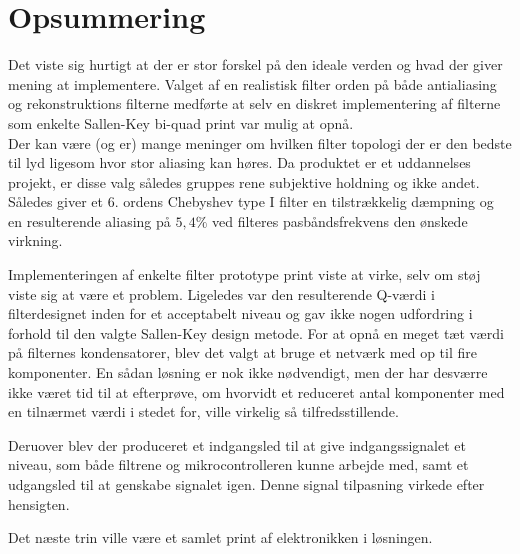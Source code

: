 \section{Opsummering}

Det viste sig hurtigt at der er stor forskel på den ideale verden og hvad der giver mening at implementere.
Valget af en realistisk filter orden på både antialiasing og rekonstruktions filterne medførte at selv en diskret implementering af filterne som enkelte Sallen-Key bi-quad print var mulig at opnå.
\\
Der kan være (og er) mange meninger om hvilken filter topologi der er den bedste til lyd ligesom hvor stor aliasing kan høres.
Da produktet er et uddannelses projekt, er disse valg således gruppes rene subjektive holdning og ikke andet.
Således giver et 6. ordens Chebyshev type I filter en tilstrækkelig dæmpning og en resulterende aliasing på  $5,4\si\percent$ ved filteres pasbåndsfrekvens den ønskede virkning. 

Implementeringen af enkelte filter prototype print viste at virke, selv om støj viste sig at være et problem.
Ligeledes var den resulterende Q-værdi i filterdesignet inden for et acceptabelt niveau og gav ikke nogen udfordring i forhold til den valgte Sallen-Key design metode. 
For at opnå en meget tæt værdi på filternes kondensatorer, blev det valgt at bruge et netværk med op til fire komponenter.
En sådan løsning er nok ikke nødvendigt, men der har desværre ikke været tid til at efterprøve, om hvorvidt et reduceret antal komponenter med en tilnærmet værdi i stedet for, ville virkelig så tilfredsstillende.

Deruover blev der produceret et indgangsled til at give indgangssignalet et niveau, som både filtrene og mikrocontrolleren kunne arbejde med, samt et udgangsled til at genskabe signalet igen.
Denne signal tilpasning virkede efter hensigten.

Det næste trin ville være et samlet print af elektronikken i løsningen.